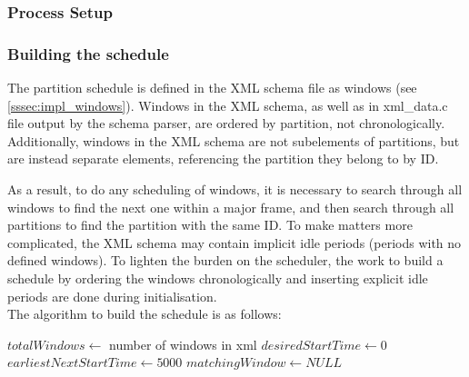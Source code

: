 \subsubsection{Process Setup}
\subsubsection{Building the schedule}
\label{sssec:build_schedule}
The partition schedule is defined in the XML schema file as windows (see 
\ref{sssec:impl_windows}). Windows in the XML schema, as well as in xml\_data.c
file output by the schema parser, are ordered by partition, not chronologically.
Additionally, windows in the XML schema are not subelements of partitions, but
are instead separate elements, referencing the partition they belong to by ID.

As a result, to do any scheduling of windows, it is necessary to search through
all windows to find the next one within a major frame, and then search through
all partitions to find the partition with the same ID. To make matters more
complicated, the XML schema may contain implicit idle periods (periods with no
defined windows). To lighten the burden on the scheduler, the work to build a
schedule by ordering the windows chronologically and inserting explicit idle
periods are done during initialisation.\\

The algorithm to build the schedule is as follows:\\
\begin{algorithm}[H]
$totalWindows \leftarrow$ number of windows in xml\;
$desiredStartTime \leftarrow 0$\;
$earliestNextStartTime \leftarrow 5000$\;
$matchingWindow \leftarrow NULL$\;
\end{algorithm}

